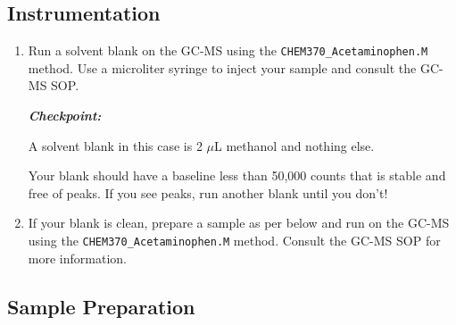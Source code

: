 \documentclass[]{tufte-book}
\providecommand{\tightlist}{%
  \setlength{\itemsep}{0pt}\setlength{\parskip}{0pt}}
\begin{document}
\hypertarget{instrumentation-3}{%
\subsection{Instrumentation}\label{instrumentation-3}}

\begin{enumerate}
\def\labelenumi{\arabic{enumi}.}
\tightlist
\item
  Run a solvent blank on the GC-MS using the \texttt{CHEM370\_Acetaminophen.M} method. Use a microliter syringe to inject your sample and consult the GC-MS SOP.

  \begin{marginfigure}
   \textbf{\emph{Checkpoint:}}

   A solvent blank in this case is 2 \(\mu\)L methanol and nothing else.

   Your blank should have a baseline less than 50,000 counts that is stable
   and free of peaks. If you see peaks, run another blank until you don't!
   \end{marginfigure}
\item
  If your blank is clean, prepare a sample as per below and run on the GC-MS using the \texttt{CHEM370\_Acetaminophen.M} method. Consult the GC-MS SOP for more information.
\end{enumerate}

\hypertarget{sample-preparation-4}{%
\subsection{Sample Preparation}\label{sample-preparation-4}}
\end{document}
